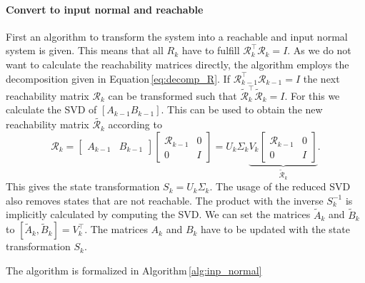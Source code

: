\documentclass[doctype=mastersthesis,BCOR=15mm,biblatex]{ldvbook}%
\newcommand{\R}{\mathcal{R}} %
\newcommand{\Ob}{\mathcal{O}} %
\newcommand{\eye}{I} %
\begin{document}

\paragraph{Convert to input normal and reachable}
First an algorithm to transform the system into a reachable and input normal system is given.
This means that all $R_k$ have to fulfill $\R_{k}^\top \R_{k}=\eye$.
As we do not want to calculate the reachability matrices directly, the algorithm employs the decomposition given in Equation\,\ref{eq:decomp_R}.
If $\R_{k-1}^\top \R_{k-1}=\eye$ the next reachability matrix $\R_{k}$ can be transformed such that $\tilde{\R}_{k}^\top \tilde{\R}_{k}=\eye$.
For this we calculate the SVD of $[A_{k-1} B_{k-1}]$.
This can be used to obtain the new reachability matrix $\tilde{\R_{k}}$ according to
\begin{equation}
\R_k = 
\begin{bmatrix}
A_{k-1} & B_{k-1}
\end{bmatrix}
\begin{bmatrix}
\R_{k-1} &0\\
0& \eye
\end{bmatrix}
=U_k\Sigma _k
\underbrace{V_k
\begin{bmatrix}
\R_{k-1} &0\\
0& \eye
\end{bmatrix}}_{\tilde{\R}_k}
.
\end{equation}
This gives the state transformation $S_k = U_k\Sigma_k$. 
The usage of the reduced SVD also removes states that are not reachable.%
The product with the inverse $S_k^{-1}$ is implicitly calculated by computing the SVD.
We can set the matrices $\tilde{A}_k$ and $\tilde{B}_k$ to $[\tilde{A}_k,\tilde{B}_k]=V_k^\top$.
The matrices $A_{k}$ and $B_{k}$ have to be updated with the state transformation $S_k$.

The algorithm is formalized in Algorithm\,\ref{alg:inp_normal}
\end{document}
